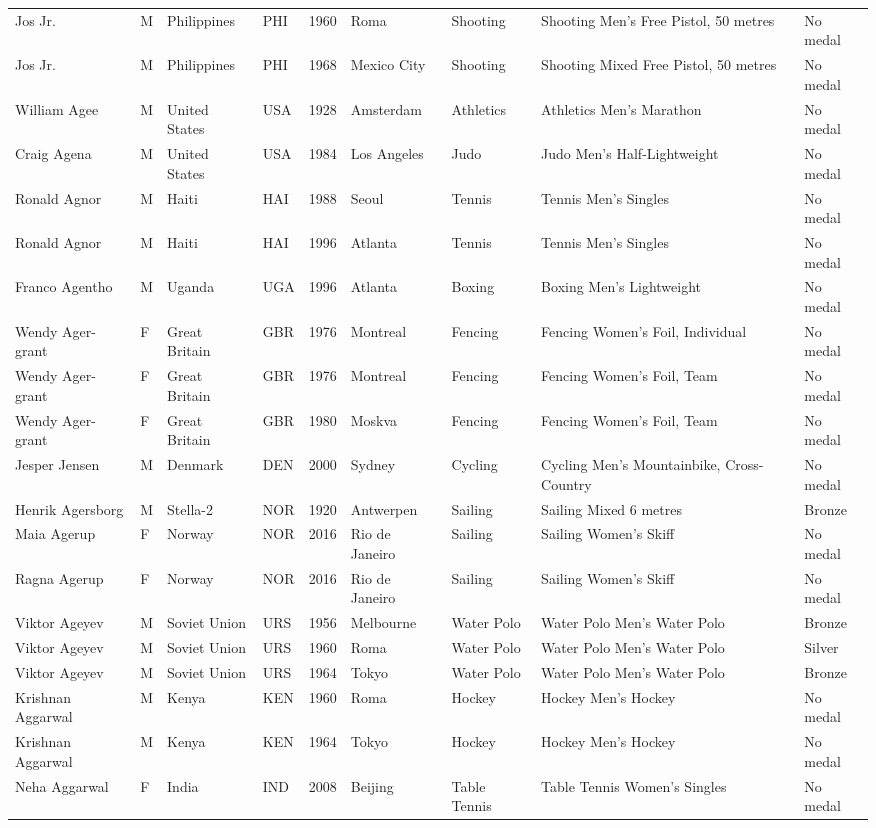 \documentclass{article}%
\begin{document}
\begin{longtable}{p{1.5cm} p{0.5cm} p{2cm} p{1cm} p{1cm} p{1.5cm} p{1.5cm} p{5cm} p{1.5cm}}
Jos Jr.&M&Philippines&PHI&1960&Roma&Shooting&Shooting Men's Free Pistol, 50 metres&No medal\\%
Jos Jr.&M&Philippines&PHI&1968&Mexico City&Shooting&Shooting Mixed Free Pistol, 50 metres&No medal\\%
William Agee&M&United States&USA&1928&Amsterdam&Athletics&Athletics Men's Marathon&No medal\\%
Craig Agena&M&United States&USA&1984&Los Angeles&Judo&Judo Men's Half{-}Lightweight&No medal\\%
Ronald Agnor&M&Haiti&HAI&1988&Seoul&Tennis&Tennis Men's Singles&No medal\\%
Ronald Agnor&M&Haiti&HAI&1996&Atlanta&Tennis&Tennis Men's Singles&No medal\\%
Franco Agentho&M&Uganda&UGA&1996&Atlanta&Boxing&Boxing Men's Lightweight&No medal\\%
Wendy Ager{-}grant&F&Great Britain&GBR&1976&Montreal&Fencing&Fencing Women's Foil, Individual&No medal\\%
Wendy Ager{-}grant&F&Great Britain&GBR&1976&Montreal&Fencing&Fencing Women's Foil, Team&No medal\\%
Wendy Ager{-}grant&F&Great Britain&GBR&1980&Moskva&Fencing&Fencing Women's Foil, Team&No medal\\%
Jesper Jensen&M&Denmark&DEN&2000&Sydney&Cycling&Cycling Men's Mountainbike, Cross{-}Country&No medal\\%
Henrik Agersborg&M&Stella{-}2&NOR&1920&Antwerpen&Sailing&Sailing Mixed 6 metres&Bronze\\%
Maia Agerup&F&Norway&NOR&2016&Rio de Janeiro&Sailing&Sailing Women's Skiff&No medal\\%
Ragna Agerup&F&Norway&NOR&2016&Rio de Janeiro&Sailing&Sailing Women's Skiff&No medal\\%
Viktor Ageyev&M&Soviet Union&URS&1956&Melbourne&Water Polo&Water Polo Men's Water Polo&Bronze\\%
Viktor Ageyev&M&Soviet Union&URS&1960&Roma&Water Polo&Water Polo Men's Water Polo&Silver\\%
Viktor Ageyev&M&Soviet Union&URS&1964&Tokyo&Water Polo&Water Polo Men's Water Polo&Bronze\\%
Krishnan Aggarwal&M&Kenya&KEN&1960&Roma&Hockey&Hockey Men's Hockey&No medal\\%
Krishnan Aggarwal&M&Kenya&KEN&1964&Tokyo&Hockey&Hockey Men's Hockey&No medal\\%
Neha Aggarwal&F&India&IND&2008&Beijing&Table Tennis&Table Tennis Women's Singles&No medal\\%

\end{longtable}
\end{document}
